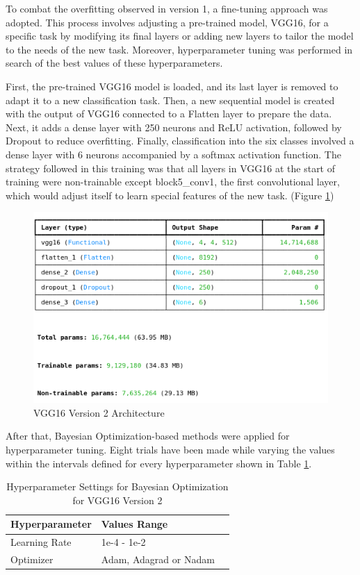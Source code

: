 \documentclass[conference]{IEEEtran}
\begin{document}
To combat the overfitting observed in version 1, a fine-tuning approach was adopted. This process involves adjusting a pre-trained model, VGG16, for a specific task by modifying its final layers or adding new layers to tailor the model to the needs of the new task. Moreover, hyperparameter tuning was performed in search of the best values of these hyperparameters.

First, the pre-trained VGG16 model is loaded, and its last layer is removed to adapt it to a new classification task. Then, a new sequential model is created with the output of VGG16 connected to a Flatten layer to prepare the data. Next, it adds a dense layer with 250 neurons and ReLU activation, followed by Dropout to reduce overfitting. Finally, classification into the six classes involved a dense layer with 6 neurons accompanied by a softmax activation function. The strategy followed in this training was that all layers in VGG16 at the start of training were non-trainable except block5\_conv1, the first convolutional layer, which would adjust itself to learn special features of the new task. (Figure \ref{fig:archVGG16_2}) 

\begin{figure}[H]
    \centering
    \includegraphics[width=0.8\linewidth]{images/archVGG16_2.png}
    \caption{VGG16 Version 2 Architecture}
    \label{fig:archVGG16_2}
\end{figure}

After that, Bayesian Optimization-based methods were applied for hyperparameter tuning. Eight trials have been made while varying the values within the intervals defined for every hyperparameter shown in Table \ref{tab:hyperparametersVGG16tV2}.

\begin{table}[H]
    \centering
    \caption{Hyperparameter Settings for Bayesian Optimization for VGG16 Version 2}
    \renewcommand{\arraystretch}{1.5}
    \begin{tabularx}{0.8\linewidth}{|X|X|X|}
    \hline
    \cellcolor[HTML]{EFEFEF}\textbf{Hyperparameter} & \cellcolor[HTML]{EFEFEF}\textbf{Values Range} \\ \hline
     Learning Rate  &  1e-4 - 1e-2\\ \hline
     Optimizer  &  Adam, Adagrad or Nadam\\ \hline
    \end{tabularx}
    \label{tab:hyperparametersVGG16tV2}
\end{table}
\end{document}
